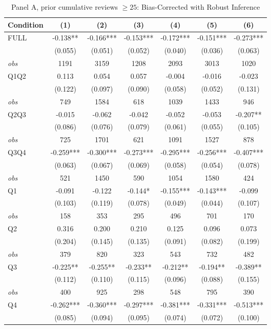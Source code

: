 \begin{table}[!htbp]
\centering
\caption{Panel A, prior cumulative reviews $\geq25$: Bias-Corrected with Robust Inference}
\begin{tabular}{lcccccc}
\toprule
Condition & (1) & (2) & (3) & (4) & (5) & (6) \\
\midrule
FULL & -0.138** & -0.166*** & -0.153*** & -0.172*** & -0.151*** & -0.273*** \\
 & (0.055) & (0.051) & (0.052) & (0.040) & (0.036) & (0.063) \\
\textit{obs} & 1191 & 3159 & 1208 & 2093 & 3013 & 1020 \\
Q1Q2 & 0.113 & 0.054 & 0.057 & -0.004 & -0.016 & -0.023 \\
 & (0.122) & (0.097) & (0.090) & (0.058) & (0.052) & (0.131) \\
\textit{obs} & 749 & 1584 & 618 & 1039 & 1433 & 946 \\
Q2Q3 & -0.015 & -0.062 & -0.042 & -0.052 & -0.053 & -0.207** \\
 & (0.086) & (0.076) & (0.079) & (0.061) & (0.055) & (0.105) \\
\textit{obs} & 725 & 1701 & 621 & 1091 & 1527 & 878 \\
Q3Q4 & -0.259*** & -0.300*** & -0.273*** & -0.295*** & -0.256*** & -0.407*** \\
 & (0.063) & (0.067) & (0.069) & (0.058) & (0.054) & (0.078) \\
\textit{obs} & 521 & 1450 & 590 & 1054 & 1580 & 424 \\
Q1 & -0.091 & -0.122 & -0.144* & -0.155*** & -0.143*** & -0.099 \\
 & (0.103) & (0.119) & (0.078) & (0.049) & (0.044) & (0.107) \\
\textit{obs} & 158 & 353 & 295 & 496 & 701 & 170 \\
Q2 & 0.316 & 0.200 & 0.210 & 0.125 & 0.096 & 0.073 \\
 & (0.204) & (0.145) & (0.135) & (0.091) & (0.082) & (0.199) \\
\textit{obs} & 379 & 820 & 323 & 543 & 732 & 482 \\
Q3 & -0.225** & -0.255** & -0.233** & -0.212** & -0.194** & -0.389** \\
 & (0.112) & (0.110) & (0.115) & (0.096) & (0.088) & (0.155) \\
\textit{obs} & 400 & 925 & 298 & 548 & 795 & 390 \\
Q4 & -0.262*** & -0.360*** & -0.297*** & -0.381*** & -0.331*** & -0.513*** \\
 & (0.085) & (0.094) & (0.095) & (0.074) & (0.072) & (0.100) \\

\end{tabular}
\end{table}
